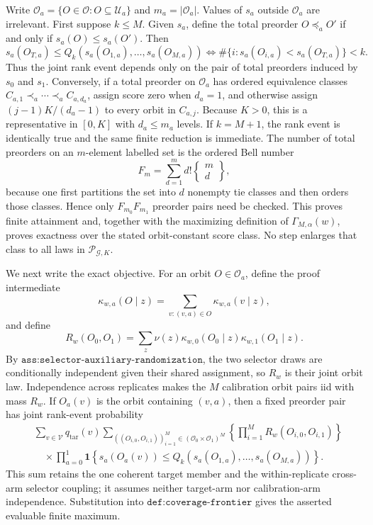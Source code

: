 Write \(\mathcal O_a=\{O\in\mathcal O:O\subseteq\mathcal U_a\}\) and \(m_a=|\mathcal O_a|\). Values of \(s_a\) outside \(\mathcal O_a\) are irrelevant. First suppose \(k\le M\). Given \(s_a\), define the total preorder \(O\preceq_a O'\) if and only if \(s_a(O)\le s_a(O')\). Then
\[
s_a(O_{T,a})\le Q_k(s_a(O_{1,a}),\ldots,s_a(O_{M,a}))
\iff \#\{i:s_a(O_{i,a})<s_a(O_{T,a})\}<k.
\tag{1}
\]
Thus the joint rank event depends only on the pair of total preorders induced by \(s_0\) and \(s_1\). Conversely, if a total preorder on \(\mathcal O_a\) has ordered equivalence classes \(C_{a,1}\prec_a\cdots\prec_a C_{a,d_a}\), assign score zero when \(d_a=1\), and otherwise assign \((j-1)K/(d_a-1)\) to every orbit in \(C_{a,j}\). Because \(K>0\), this is a representative in \([0,K]\) with \(d_a\le m_a\) levels. If \(k=M+1\), the rank event is identically true and the same finite reduction is immediate. The number of total preorders on an \(m\)-element labelled set is the ordered Bell number
\[
F_m=\sum_{d=1}^m d!\left\{\begin{matrix}m\\d\end{matrix}\right\},
\tag{2}
\]
because one first partitions the set into \(d\) nonempty tie classes and then orders those classes. Hence only \(F_{m_0}F_{m_1}\) preorder pairs need be checked. This proves finite attainment and, together with the maximizing definition of \(\Gamma_{M,\alpha}(w)\), proves exactness over the stated orbit-constant score class. No step enlarges that class to all laws in \(\mathcal P_{\mathcal G,K}\).

We next write the exact objective. For an orbit \(O\in\mathcal O_a\), define the proof intermediate
\[
\kappa_{w,a}(O\mid z)=\sum_{v:(v,a)\in O}\kappa_{w,a}(v\mid z),
\]
and define
\[
R_w(O_0,O_1)=\sum_z\nu(z)\kappa_{w,0}(O_0\mid z)\kappa_{w,1}(O_1\mid z).
\tag{3}
\]
By \(\texttt{ass:selector-auxiliary-randomization}\), the two selector draws are conditionally independent given their shared assignment, so \(R_w\) is their joint orbit law. Independence across replicates makes the \(M\) calibration orbit pairs iid with mass \(R_w\). If \(O_a(v)\) is the orbit containing \((v,a)\), then a fixed preorder pair has joint rank-event probability
\[
\begin{aligned}
&\sum_{v\in\mathcal V}q_{\mathrm{tar}}(v)\!\sum_{((O_{i,0},O_{i,1}))_{i=1}^M\in(\mathcal O_0\times\mathcal O_1)^M}\!\left\{\prod_{i=1}^M R_w(O_{i,0},O_{i,1})\right\}\\
&\quad\times\prod_{a=0}^1\mathbf 1\!\left\{s_a(O_a(v))\le Q_k(s_a(O_{1,a}),\ldots,s_a(O_{M,a}))\right\}.
\end{aligned}
\tag{4}
\]
This sum retains the one coherent target member and the within-replicate cross-arm selector coupling; it assumes neither target-arm nor calibration-arm independence. Substitution into \(\texttt{def:coverage-frontier}\) gives the asserted evaluable finite maximum.

